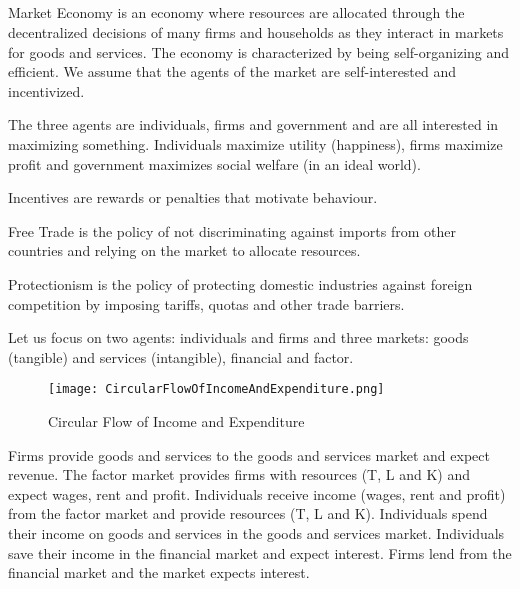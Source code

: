 \subsection{}

\begin{definition}
    Market Economy is an economy where resources are allocated through the decentralized decisions of many firms and households as they interact in markets for goods and services.
    The economy is characterized by being self-organizing and efficient.
    We assume that the agents of the market are self-interested and incentivized.
\end{definition}

The three agents are individuals, firms and government and are all interested in maximizing something.
Individuals maximize utility (happiness), firms maximize profit and government maximizes social welfare (in an ideal world).

\begin{definition}
    Incentives are rewards or penalties that motivate behaviour.
\end{definition}

\begin{definition}
    Free Trade is the policy of not discriminating against imports from other countries and relying on the market to allocate resources.
\end{definition}

\begin{definition}
    Protectionism is the policy of protecting domestic industries against foreign competition by imposing tariffs, quotas and other trade barriers.
\end{definition}

\begin{example}
    Let us focus on two agents: individuals and firms and three markets: goods (tangible) and services (intangible), financial and factor.
    \begin{figure}[h!]
        \centering
        \texttt{[image: CircularFlowOfIncomeAndExpenditure.png]}
        \caption{Circular Flow of Income and Expenditure}
    \end{figure}
    Firms provide goods and services to the goods and services market and expect revenue.
    The factor market provides firms with resources (T, L and K) and expect wages, rent and profit.
    Individuals receive income (wages, rent and profit) from the factor market and provide resources (T, L and K).
    Individuals spend their income on goods and services in the goods and services market.
    Individuals save their income in the financial market and expect interest.
    Firms lend from the financial market and the market expects interest.

\end{example}
